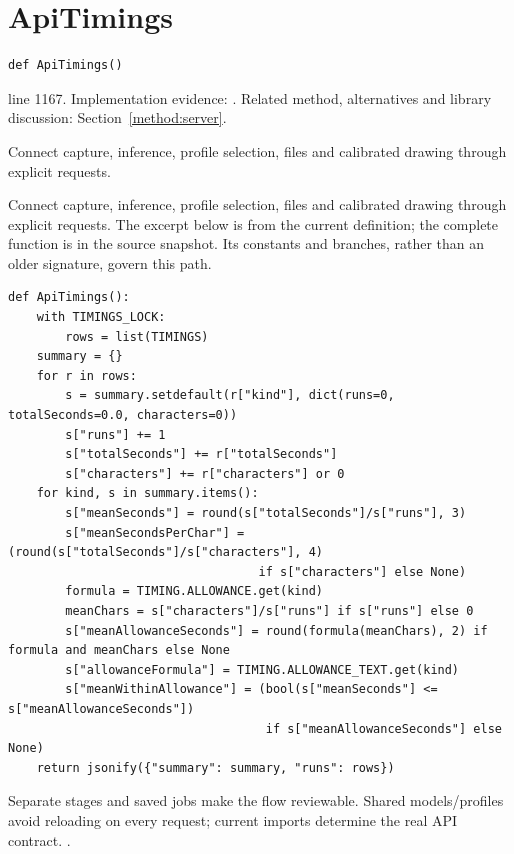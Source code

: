 \section{ApiTimings}\label{fn:web-server:ApiTimings}
\begin{lstlisting}[style=sig]
def ApiTimings()
\end{lstlisting}
 line 1167. Implementation evidence: \cite{code2026}. Related method, alternatives and library discussion: Section~\ref{method:server}.


Connect capture, inference, profile selection, files and calibrated drawing through explicit requests.


Connect capture, inference, profile selection, files and calibrated drawing through explicit requests. The excerpt below is from the current definition; the complete function is in the source snapshot. Its constants and branches, rather than an older signature, govern this path.


\begin{lstlisting}[style=plain]
def ApiTimings():
    with TIMINGS_LOCK:
        rows = list(TIMINGS)
    summary = {}
    for r in rows:
        s = summary.setdefault(r["kind"], dict(runs=0, totalSeconds=0.0, characters=0))
        s["runs"] += 1
        s["totalSeconds"] += r["totalSeconds"]
        s["characters"] += r["characters"] or 0
    for kind, s in summary.items():
        s["meanSeconds"] = round(s["totalSeconds"]/s["runs"], 3)
        s["meanSecondsPerChar"] = (round(s["totalSeconds"]/s["characters"], 4)
                                   if s["characters"] else None)
        formula = TIMING.ALLOWANCE.get(kind)
        meanChars = s["characters"]/s["runs"] if s["runs"] else 0
        s["meanAllowanceSeconds"] = round(formula(meanChars), 2) if formula and meanChars else None
        s["allowanceFormula"] = TIMING.ALLOWANCE_TEXT.get(kind)
        s["meanWithinAllowance"] = (bool(s["meanSeconds"] <= s["meanAllowanceSeconds"])
                                    if s["meanAllowanceSeconds"] else None)
    return jsonify({"summary": summary, "runs": rows})
\end{lstlisting}
Separate stages and saved jobs make the flow reviewable. Shared models/profiles avoid reloading on every request; current imports determine the real API contract. \cite{flaskdocs,pillowops,code2026}.


